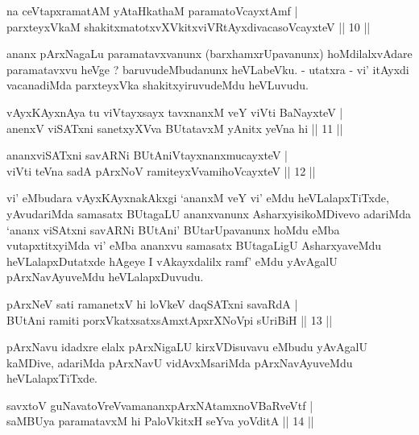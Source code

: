 \begin{shl}
na ceVtapxramatAM yAtaHkathaM paramatoVcayxtAmf | \\
parxteyxVkaM shakitxmatotxvXVkitxviVRtAyxdivacasoVcayxteV \hfill ||  10 || 
\end{shl}

\begin{artha}
ananx pArxNagaLu paramatavxvanunx (barxhamxrUpavanunx) hoMdilalxvAdare paramatavxvu heVge ? baruvudeMbudanunx heVLabeVku. - utatxra - vi' itAyxdi vacanadiMda parxteyxVka shakitxyiruvudeMdu heVLuvudu.
\end{artha}


\begin{shl}
vAyxKAyxnAya tu viVtayxsayx tavxnanxM veY viVti BaNayxteV | \\
anenxV viSATxni sanetxyXVva BUtatavxM yAnitx yeVna hi \hfill ||  11 ||
\end{shl}

\begin{shl}
ananxviSATxni savARNi BUtAniVtayxnanxmucayxteV  | \\
viVti teVna sadA pArxNoV ramiteyxVvamihoVcayxteV \hfill ||  12 || 
\end{shl}

\begin{artha}
vi' eMbudara vAyxKAyxnakAkxgi `ananxM veY vi' eMdu heVLalapxTiTxde, yAvudariMda samasatx BUtagaLU ananxvanunx AsharxyisikoMDivevo adariMda `ananx viSAtxni savARNi BUtAni' BUtarUpavanunx hoMdu eMba vutapxtitxyiMda vi' eMba ananxvu samasatx BUtagaLigU AsharxyaveMdu heVLalapxDutatxde hAgeye I vAkayxdalilx ramf' eMdu yAvAgalU pArxNavAyuveMdu heVLalapxDuvudu.
\end{artha}

\begin{shl}
pArxNeV sati ramanetxV hi loVkeV daqSATxni savaRdA  | \\
BUtAni ramiti porxVkatxsatxsAmxtApxrXNoV\s pi sUriBiH \hfill ||  13 || 
\end{shl}

\begin{artha}
pArxNavu idadxre elalx pArxNigaLU kirxVDisuvavu eMbudu yAvAgalU kaMDive, adariMda pArxNavU vidAvxMsariMda pArxNavAyuveMdu heVLalapxTiTxde.
\end{artha}

\begin{shl}
savxtoV guNavatoVreVvamananxpArxNAtamxnoVBaRveVtf  | \\
saMBUya paramatavxM hi PaloVkitxH seYva yoVditA \hfill ||  14 || 
\end{shl}

